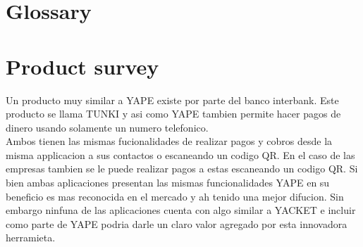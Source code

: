 \documentclass{article}
\begin{document}
\section{Glossary}



\section{Product survey}
Un producto muy similar a YAPE existe por parte del banco interbank. Este producto se llama TUNKI y asi como YAPE tambien permite hacer pagos de dinero usando solamente un numero telefonico.\\
Ambos tienen las mismas fucionalidades de realizar pagos y cobros desde la misma applicacion a sus contactos o escaneando un codigo QR. En el caso de las empresas tambien se le puede realizar pagos a estas escaneando un codigo QR. Si bien ambas aplicaciones presentan las mismas funcionalidades YAPE en su beneficio es mas reconocida en el mercado y ah tenido una mejor difucion.  Sin embargo ninfuna de las aplicaciones cuenta con algo similar a YACKET e incluir como parte de YAPE podria darle un claro valor agregado por esta innovadora herramieta.
\end{document}
